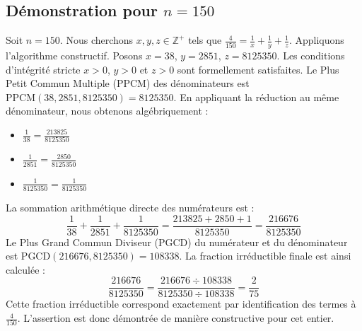 \documentclass[11pt,a4paper]{article}
\begin{document}
\subsection{Démonstration pour $n = 150$}
Soit $n = 150$. Nous cherchons $x, y, z \in \mathbb{Z}^{+}$ tels que $\frac{4}{150} = \frac{1}{x} + \frac{1}{y} + \frac{1}{z}$.
Appliquons l'algorithme constructif. Posons $x = 38$, $y = 2851$, $z = 8125350$.
Les conditions d'intégrité stricte $x > 0$, $y > 0$ et $z > 0$ sont formellement satisfaites.
Le Plus Petit Commun Multiple (PPCM) des dénominateurs est $\text{PPCM}(38, 2851, 8125350) = 8125350$.
En appliquant la réduction au même dénominateur, nous obtenons algébriquement :
\begin{itemize}
    \item $\frac{1}{38} = \frac{213825}{8125350}$
    \item $\frac{1}{2851} = \frac{2850}{8125350}$
    \item $\frac{1}{8125350} = \frac{1}{8125350}$
\end{itemize}
La sommation arithmétique directe des numérateurs est :
$$ \frac{1}{38} + \frac{1}{2851} + \frac{1}{8125350} = \frac{213825 + 2850 + 1}{8125350} = \frac{216676}{8125350} $$
Le Plus Grand Commun Diviseur (PGCD) du numérateur et du dénominateur est $\text{PGCD}(216676, 8125350) = 108338$.
La fraction irréductible finale est ainsi calculée :
$$ \frac{216676}{8125350} = \frac{216676 \div 108338}{8125350 \div 108338} = \frac{2}{75} $$
Cette fraction irréductible correspond exactement par identification des termes à $\frac{4}{150}$. L'assertion est donc démontrée de manière constructive pour cet entier.
\end{document}
